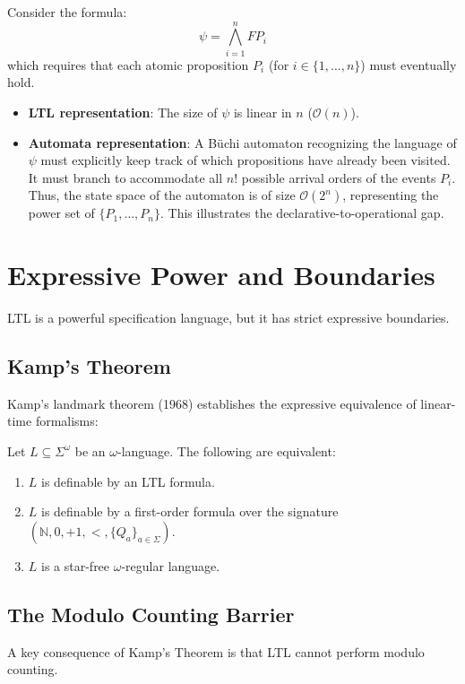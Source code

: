 Consider the formula:
\[
  \psi = \bigwedge_{i=1}^n F P_i
\]
which requires that each atomic proposition $P_i$ (for $i \in \{1, \dots, n\}$) must eventually hold.
\begin{itemize}
    \item \textbf{LTL representation}: The size of $\psi$ is linear in $n$ ($\mathcal{O}(n)$).
    \item \textbf{Automata representation}: A Büchi automaton recognizing the language of $\psi$ must explicitly keep track of which propositions have already been visited. It must branch to accommodate all $n!$ possible arrival orders of the events $P_i$. Thus, the state space of the automaton is of size $\mathcal{O}(2^n)$, representing the power set of $\{P_1, \dots, P_n\}$. This illustrates the declarative-to-operational gap.
\end{itemize}

\section{Expressive Power and Boundaries}
\label{sec:ltl-expressivity}

LTL is a powerful specification language, but it has strict expressive boundaries.

\subsection{Kamp's Theorem}
Kamp's landmark theorem (1968) establishes the expressive equivalence of linear-time formalisms:
\begin{theorem}[Kamp]
\label{thm:kamp}
Let $L \subseteq \Sigma^\omega$ be an $\omega$-language. The following are equivalent:
\begin{enumerate}
    \item $L$ is definable by an LTL formula.
    \item $L$ is definable by a first-order formula over the signature $(\mathbb{N}, 0, +1, <, \{Q_a\}_{a\in\Sigma})$.
    \item $L$ is a star-free $\omega$-regular language.
\end{enumerate}
\end{theorem}

\subsection{The Modulo Counting Barrier}
A key consequence of Kamp's Theorem is that LTL cannot perform modulo counting. 

